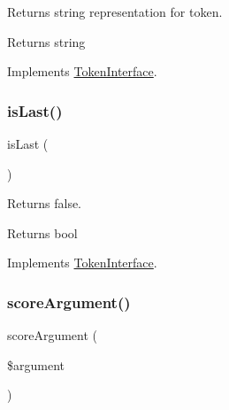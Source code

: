 Returns string representation for token.

\begin{DoxyReturn}{Returns}
string 
\end{DoxyReturn}


Implements \mbox{\hyperlink{interface_prophecy_1_1_argument_1_1_token_1_1_token_interface_a7516ca30af0db3cdbf9a7739b48ce91d}{Token\+Interface}}.

\mbox{\label{class_prophecy_1_1_argument_1_1_token_1_1_type_token_ac72b8349b1340887fc1af30eca2b951c}} 
\subsubsection{\texorpdfstring{is\+Last()}{isLast()}}
{\footnotesize\ttfamily is\+Last (\begin{DoxyParamCaption}{ }\end{DoxyParamCaption})}

Returns false.

\begin{DoxyReturn}{Returns}
bool 
\end{DoxyReturn}


Implements \mbox{\hyperlink{interface_prophecy_1_1_argument_1_1_token_1_1_token_interface_ac72b8349b1340887fc1af30eca2b951c}{Token\+Interface}}.

\mbox{\label{class_prophecy_1_1_argument_1_1_token_1_1_type_token_a8d5bf47ab6eaa935458d5ad160e52822}} 
\subsubsection{\texorpdfstring{score\+Argument()}{scoreArgument()}}
{\footnotesize\ttfamily score\+Argument (\begin{DoxyParamCaption}\item[{}]{\$argument }\end{DoxyParamCaption})}

